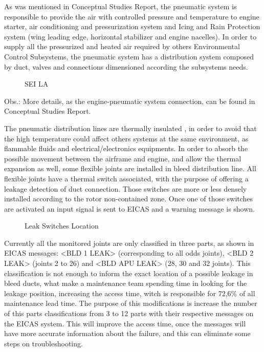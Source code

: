 ﻿As was mentioned in Conceptual Studies Report, the pneumatic system is responsible to provide the air with controlled pressure and temperature to engine starter, air conditioning and pressurization system and Icing and Rain Protection system (wing leading edge, horizontal stabilizer and engine nacelles). In order to supply all the pressurized and heated air required by others Environmental Control Subsystems, the pneumatic system has a distribution system composed by duct, valves and connections dimensioned according the subsystems needs.


\begin{figure}[H] %
\caption{SEI LA}
\label{fig:PneumaticConection}
\end{figure}

Obs.: More details, as the engine-pneumatic system connection, can be found in Conceptual Studies Report.

The pneumatic distribution lines are thermally insulated , in order to avoid that the high temperature could affect others systems at the same environment, as flammable fluids and electrical/electronics equipments.
 In order to absorb the possible movement between the airframe and engine, and allow the thermal expansion as well, some flexible joints are installed in bleed distribution line. All flexible joints have a thermal switch associated, with the purpose of offering a leakage detection of duct connection. Those switches are more or less densely installed according to the rotor non-contained zone. Once one of those switches are activated an input signal is sent to EICAS and a warning message is shown.


\begin{figure}[H] %
\caption{Leak Switches Location}
\label{fig:leakswitcheslocation}
\end{figure}

Currently all the monitored joints are only classified in three parts, as shown in EICAS messages: <BLD 1 LEAK> (corresponding to all odds joints), <BLD 2 LEAK> (joints 2 to 26) and <BLD APU LEAK> (28, 30 and 32 joints). This classification is not enough to inform the exact location of a possible leakage in bleed ducts, what make a maintenance team spending time in looking for the leakage position, increasing the access time, witch is responsible for 72,6\% of all maintenance lead time.
The purpose of this modifications is increase the number of this parts classifications from 3 to 12 parts with their respective messages on the EICAS system. This will improve the access time, once the messages will have more accurate information about the failure, and this can eliminate some steps on troubleshooting.

